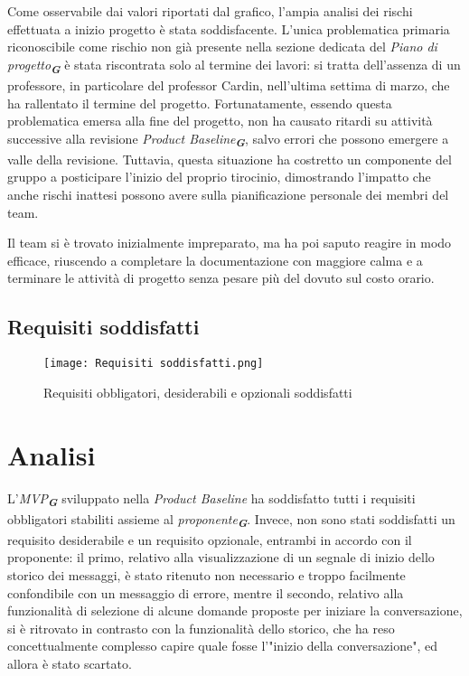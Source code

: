 Come osservabile dai valori riportati dal grafico, l’ampia analisi dei rischi effettuata a inizio progetto è stata soddisfacente. 
L'unica problematica primaria riconoscibile come rischio non già presente nella sezione dedicata del \emph{Piano di progetto}\textsubscript{\textbf{\textit{G}}} è stata riscontrata solo al termine dei lavori: 
si tratta dell'assenza di un professore, in particolare del professor Cardin, nell'ultima settima di marzo, che ha rallentato il termine del progetto. 
Fortunatamente, essendo questa problematica emersa alla fine del progetto, non ha causato ritardi su attività successive alla revisione \emph{Product Baseline}\textsubscript{\textbf{\textit{G}}}, 
salvo errori che possono emergere a valle della revisione.
Tuttavia, questa situazione ha costretto un componente del gruppo a posticipare l'inizio del proprio tirocinio, dimostrando l'impatto che anche rischi inattesi possono avere sulla pianificazione personale dei membri del team.



Il team si è trovato inizialmente impreparato, ma ha poi saputo reagire in modo efficace, 
riuscendo a completare la documentazione con maggiore calma e a terminare le attività di progetto 
senza pesare più del dovuto sul costo orario.



\newpage

\subsection{Requisiti soddisfatti}
\label{subsec:Requisiti soddisfatti}

\begin{figure}[h] 
    \centering
    \texttt{[image: Requisiti soddisfatti.png]}
    \caption{Requisiti obbligatori, desiderabili e opzionali soddisfatti} 
    \label{fig: Requisiti soddisfatti}
\end{figure}

\section*{Analisi}
L'\emph{MVP}\textsubscript{\textbf{\textit{G}}} sviluppato nella \emph{Product Baseline} ha soddisfatto tutti i requisiti obbligatori stabiliti assieme al \emph{proponente}\textsubscript{\textbf{\textit{G}}}. Invece, non sono stati soddisfatti un requisito desiderabile e un requisito opzionale, entrambi in accordo con il proponente: il primo, relativo alla visualizzazione di un segnale di inizio dello storico dei messaggi, è stato ritenuto non necessario e troppo facilmente confondibile con un messaggio di errore, mentre il secondo, relativo alla funzionalità di selezione di alcune domande proposte per iniziare la conversazione, si è ritrovato in contrasto con la funzionalità dello storico, che ha reso concettualmente complesso capire quale fosse l'"inizio della conversazione", ed allora è stato scartato.

